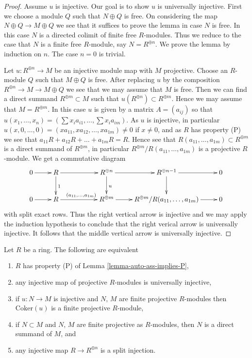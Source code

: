 \begin{proof}
Assume $u$ is injective. Our goal is to show $u$ is universally injective.
First we choose a module $Q$ such that $N \oplus Q$ is free. On considering
the map $N \oplus Q \to M \oplus Q$ we see that it suffices to prove
the lemma in case $N$ is free. In this case $N$ is a directed colimit of
finite free $R$-modules. Thus we reduce to the case that $N$ is a finite
free $R$-module, say $N = R^{\oplus n}$. We prove the lemma by induction
on $n$. The case $n = 0$ is trivial.

\medskip\noindent
Let $u : R^{\oplus n} \to M$ be an injective module map with $M$ projective.
Choose an $R$-module $Q$ such that $M \oplus Q$ is free. After replacing
$u$ by the composition $R^{\oplus n} \to M \to M \oplus Q$ we see that
we may assume that $M$ is free. Then we can find a direct summand
$R^{\oplus m} \subset M$ such that $u(R^{\oplus n}) \subset R^{\oplus m}$.
Hence we may assume that $M = R^{\oplus m}$.
In this case $u$ is given by a matrix $A = (a_{ij})$ so that
$u(x_1, \ldots, x_n) = (\sum x_i a_{i1}, \ldots, \sum x_i a_{im})$.
As $u$ is injective, in particular
$u(x, 0, \ldots, 0) = (xa_{11}, xa_{12}, \ldots, xa_{1m}) \not = 0$ if
$x \not = 0$, and as $R$ has property (P) we see that
$a_{11}R + a_{12}R + \ldots + a_{1m}R = R$. Hence see that
$R(a_{11}, \ldots, a_{1m}) \subset R^{\oplus m}$ is a direct summand
of $R^{\oplus m}$, in particular $R^{\oplus m}/R(a_{11}, \ldots, a_{1m})$
is a projective $R$-module. We get a commutative diagram
$$
\xymatrix{
0 \ar[r] &
R \ar[rr] \ar[d]^1 & & R^{\oplus n} \ar[r] \ar[d]^u &
R^{\oplus n - 1} \ar[r] \ar[d] & 0 \\
0 \ar[r] & R \ar[rr]^{(a_{11}, \ldots, a_{1m})} & &
R^{\oplus m} \ar[r] & R^{\oplus m}/R(a_{11}, \ldots, a_{1m}) \ar[r] & 0
}
$$
with split exact rows. Thus the right vertical arrow is injective
and we may apply the induction hypothesis to conclude that
the right verical arrow is universally injective. It follows that the
middle vertical arrow is universally injective.
\end{proof}

\begin{lemma}
\label{lemma-P-fPD-zero}
Let $R$ be a ring. The following are equivalent
\begin{enumerate}
\item $R$ has property (P) of
Lemma \ref{lemma-auto-ass-implies-P},
\item any injective map of projective $R$-modules is
universally injective,
\item if $u : N \to M$ is injective and $N$, $M$ are finite projective
$R$-modules then $\text{Coker}(u)$ is a finite projective $R$-module,
\item if $N \subset M$ and $N$, $M$ are finite projective as $R$-modules, then
$N$ is a direct summand of $M$, and
\item any injective map $R \to R^{\oplus n}$ is a split injection.
\end{enumerate}
\end{lemma}

